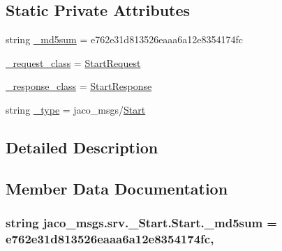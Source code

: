 \subsection*{Static Private Attributes}
\begin{DoxyCompactItemize}
\item 
string \hyperlink{classjaco__msgs_1_1srv_1_1__Start_1_1Start_a5fc4b833602ce71b402d2bcedf561471}{\+\_\+md5sum} = \textquotesingle{}e762e31d813526eaaa6a12e8354174fc\textquotesingle{}
\item 
\hyperlink{classjaco__msgs_1_1srv_1_1__Start_1_1Start_a402bb568aa7bdf40de49081a4fda2ba4}{\+\_\+request\+\_\+class} = \hyperlink{classjaco__msgs_1_1srv_1_1__Start_1_1StartRequest}{Start\+Request}
\item 
\hyperlink{classjaco__msgs_1_1srv_1_1__Start_1_1Start_a259aab253ab2228a411fed54d8e377dd}{\+\_\+response\+\_\+class} = \hyperlink{classjaco__msgs_1_1srv_1_1__Start_1_1StartResponse}{Start\+Response}
\item 
string \hyperlink{classjaco__msgs_1_1srv_1_1__Start_1_1Start_af94dab1726ee365380324d5ddb6bacc0}{\+\_\+type} = \textquotesingle{}jaco\+\_\+msgs/\hyperlink{classjaco__msgs_1_1srv_1_1__Start_1_1Start}{Start}\textquotesingle{}
\end{DoxyCompactItemize}


\subsection{Detailed Description}


\subsection{Member Data Documentation}
\subsubsection[{\texorpdfstring{\+\_\+md5sum}{_md5sum}}]{\setlength{\rightskip}{0pt plus 5cm}string jaco\+\_\+msgs.\+srv.\+\_\+\+Start.\+Start.\+\_\+md5sum = \textquotesingle{}e762e31d813526eaaa6a12e8354174fc\textquotesingle{}\hspace{0.3cm}{\ttfamily [static]}, {\ttfamily [private]}}\hypertarget{classjaco__msgs_1_1srv_1_1__Start_1_1Start_a5fc4b833602ce71b402d2bcedf561471}{}\label{classjaco__msgs_1_1srv_1_1__Start_1_1Start_a5fc4b833602ce71b402d2bcedf561471}
